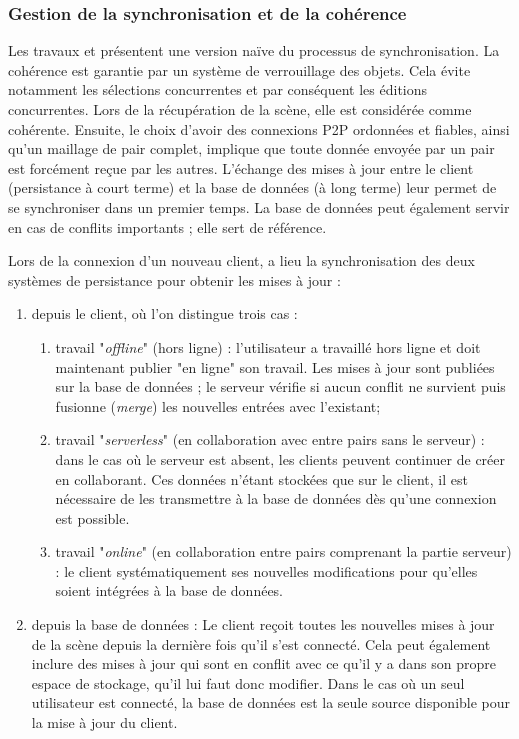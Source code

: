 \subsubsection{Gestion de la synchronisation et de la cohérence}
\label{sec:synchronisation-client-serveur}

Les travaux \cite{Desprat2015a} et \cite{Desprat2015b} présentent une version 
naïve du processus de synchronisation. La cohérence est garantie par un système 
de verrouillage des objets. Cela évite notamment les sélections concurrentes et par 
conséquent les éditions concurrentes. 
Lors de la récupération de la scène, elle est considérée comme cohérente. 
Ensuite, le choix d'avoir des connexions \gls{P2P} ordonnées et fiables, ainsi 
qu'un maillage de pair complet, implique que toute donnée envoyée par un pair est 
forcément reçue par les autres. 
L'échange des mises à jour entre le client (persistance à court terme) et la 
base de données (à long terme) leur permet de se synchroniser dans un premier 
temps. La base de données peut également servir en cas de conflits importants ; 
elle sert de référence.

Lors de la connexion d'un nouveau client, a lieu la synchronisation des deux 
systèmes de persistance pour obtenir les mises à jour : 

\begin{enumerate}
	\item depuis le client, où l'on distingue trois cas :
	\begin{enumerate}
		\item travail "\textit{offline}" (hors ligne) : l'utilisateur a travaillé hors ligne et 
		doit maintenant publier "en ligne" son travail. Les mises à jour sont publiées 
		sur la base de données ; le serveur vérifie si aucun conflit ne survient puis 
		fusionne (\textit{merge}) les nouvelles entrées avec l'existant; 
		
		\item travail "\textit{serverless}" (en collaboration avec entre pairs sans le 
		serveur) : dans le cas où le serveur est absent, les clients peuvent continuer 
		de créer en collaborant. Ces données n'étant stockées que sur le client, il est 
		nécessaire de les transmettre à la base de données dès qu'une connexion 
		est possible. 
		
		\item travail "\textit{online}" (en collaboration entre pairs comprenant la partie
		serveur) : le client systématiquement ses 
		nouvelles modifications pour qu'elles soient intégrées à la base de données.
	\end{enumerate}
	\item depuis la base de données :
	Le client reçoit toutes les nouvelles mises à jour de la scène depuis la dernière 
	fois qu'il s'est connecté. Cela peut également inclure des mises à jour qui sont 
	en conflit avec ce qu'il y a dans son propre espace de stockage, qu'il lui faut 
	donc modifier.
	Dans le cas où un seul utilisateur est connecté, la base de données est la 
	seule source disponible pour la mise à jour du client. 
\end{enumerate}


